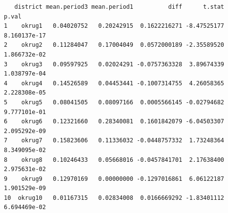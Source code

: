 \documentclass[
  letterpaper,
  DIV=11,
  numbers=noendperiod]{scrartcl}
\newenvironment{Shaded}{\begin{snugshade}}{\end{snugshade}}
\newcommand{\AttributeTok}[1]{\textcolor[rgb]{0.40,0.45,0.13}{#1}}
\newcommand{\ConstantTok}[1]{\textcolor[rgb]{0.56,0.35,0.01}{#1}}
\newcommand{\ControlFlowTok}[1]{\textcolor[rgb]{0.00,0.23,0.31}{\textbf{#1}}}
\newcommand{\DecValTok}[1]{\textcolor[rgb]{0.68,0.00,0.00}{#1}}
\newcommand{\FloatTok}[1]{\textcolor[rgb]{0.68,0.00,0.00}{#1}}
\newcommand{\FunctionTok}[1]{\textcolor[rgb]{0.28,0.35,0.67}{#1}}
\newcommand{\NormalTok}[1]{\textcolor[rgb]{0.00,0.23,0.31}{#1}}
\newcommand{\OtherTok}[1]{\textcolor[rgb]{0.00,0.23,0.31}{#1}}
\newcommand{\SpecialCharTok}[1]{\textcolor[rgb]{0.37,0.37,0.37}{#1}}
\newcommand{\StringTok}[1]{\textcolor[rgb]{0.13,0.47,0.30}{#1}}
\begin{document}
\begin{Shaded}
\end{Shaded}

\begin{verbatim}
   district mean.period3 mean.period1          diff      t.stat        p.val
1    okrug1   0.04020752   0.20242915  0.1622216271 -8.47525177 8.160137e-17
2    okrug2   0.11284047   0.17004049  0.0572000189 -2.35589520 1.866732e-02
3    okrug3   0.09597925   0.02024291 -0.0757363328  3.89674339 1.038797e-04
4    okrug4   0.14526589   0.04453441 -0.1007314755  4.26058365 2.228308e-05
5    okrug5   0.08041505   0.08097166  0.0005566145 -0.02794682 9.777101e-01
6    okrug6   0.12321660   0.28340081  0.1601842079 -6.04503307 2.095292e-09
7    okrug7   0.15823606   0.11336032 -0.0448757332  1.73248364 8.349095e-02
8    okrug8   0.10246433   0.05668016 -0.0457841701  2.17638400 2.975631e-02
9    okrug9   0.12970169   0.00000000 -0.1297016861  6.06122187 1.901529e-09
10  okrug10   0.01167315   0.02834008  0.0166669292 -1.83401112 6.694469e-02
\end{verbatim}
\end{document}
